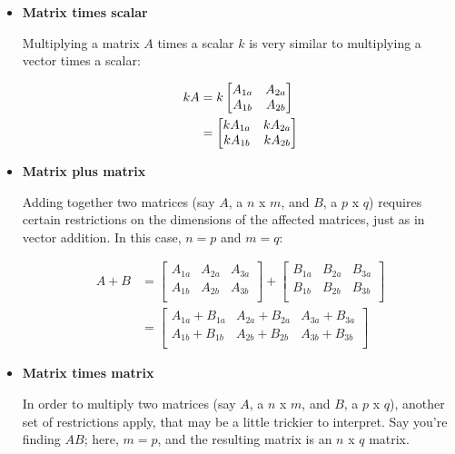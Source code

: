 \documentclass[12pt]{article}
\begin{document}
\begin{itemize}
    \item \textbf{Matrix times scalar}
    
    Multiplying a matrix $A$ times a scalar $k$ is very similar to multiplying a vector times a scalar:
    
    \begin{equation}
        \begin{split}
            kA &= k\begin{bmatrix} A_{1a} &A_{2a}\\ A_{1b} &A_{2b}\\ \end{bmatrix}\\
            &= \begin{bmatrix} k A_{1a} &k A_{2a}\\ k A_{1b} &k A_{2b}\\ \end{bmatrix}\\
        \end{split}
    \end{equation}
    
    \item \textbf{Matrix plus matrix}
    
    Adding together two matrices (say $A$, a $n$ x $m$, and $B$, a $p$ x $q$) requires certain restrictions on the dimensions of the affected matrices, just as in vector addition. In this case, $n=p$ and $m=q$:
    
    \begin{equation}
        \begin{split}
            A + B &= \begin{bmatrix}
            A_{1a} & A_{2a} & A_{3a}\\
            A_{1b} & A_{2b} & A_{3b}\\
            \end{bmatrix} + \begin{bmatrix}
            B_{1a} & B_{2a} & B_{3a}\\
            B_{1b} & B_{2b} & B_{3b}\\
            \end{bmatrix}\\
            &= \begin{bmatrix}
            A_{1a}+B_{1a} & A_{2a}+B_{2a} & A_{3a}+B_{3a}\\
            A_{1b}+B_{1b} & A_{2b}+B_{2b} & A_{3b}+B_{3b}\\
            \end{bmatrix}
        \end{split}
    \end{equation}
    \item \textbf{Matrix times matrix}
    
    In order to multiply two matrices (say $A$, a $n$ x $m$, and $B$, a $p$ x $q$), another set of restrictions apply, that may be a little trickier to interpret. Say you're finding $AB$; here, $m = p$, and the resulting matrix is an $n$ x $q$ matrix. 
    

\end{itemize}
\end{document}
